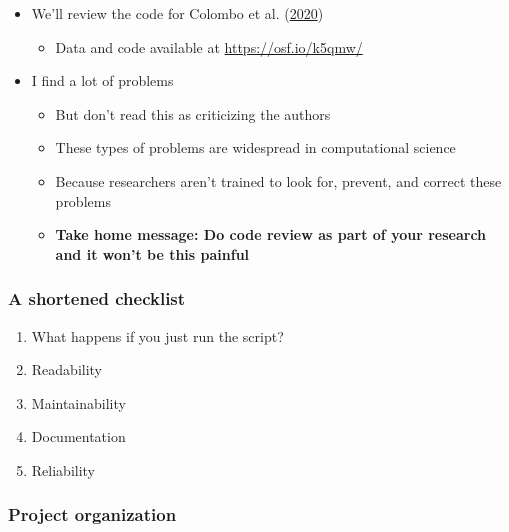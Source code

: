 \documentclass[
]{article}
\providecommand{\tightlist}{%
  \setlength{\itemsep}{0pt}\setlength{\parskip}{0pt}}
\begin{document}
\begin{itemize}
\tightlist
\item
  We'll review the code for Colombo et al. (\protect\hyperlink{ref-ColomboIntellectuallyHumblePrejudiced2020}{2020})

  \begin{itemize}
  \tightlist
  \item
    Data and code available at \url{https://osf.io/k5qmw/}
  \end{itemize}
\item
  I find a lot of problems

  \begin{itemize}
  \tightlist
  \item
    But don't read this as criticizing the authors
  \item
    These types of problems are widespread in computational science
  \item
    Because researchers aren't trained to look for, prevent, and correct these problems
  \item
    \textbf{Take home message: Do code review as part of your research and it won't be this painful}
  \end{itemize}
\end{itemize}

\hypertarget{a-shortened-checklist}{%
\subsubsection{A shortened checklist}\label{a-shortened-checklist}}

\begin{enumerate}
\def\labelenumi{\arabic{enumi}.}
\setcounter{enumi}{-1}
\tightlist
\item
  What happens if you just run the script?
\item
  Readability
\item
  Maintainability
\item
  Documentation
\item
  Reliability
\end{enumerate}

\hypertarget{project-organization}{%
\subsubsection{Project organization}\label{project-organization}}
\end{document}
